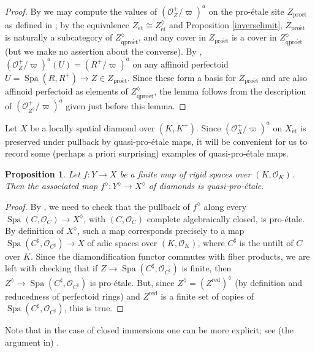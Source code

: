 \documentclass{amsart}
\newtheorem{prop}[subsubsection]{Proposition}
\theoremstyle{remark}
\numberwithin{equation}{subsection}
\newcommand{\cO}{{\mathcal O}}
\DeclareMathOperator{\Spa}{Spa}
\newcommand{\red}{\mathrm{red}}
\newcommand{\et}{\mathrm{\acute{e}t}}
\newcommand{\proet}{\mathrm{pro\acute{e}t}}
\newcommand{\qp}{\mathrm{qpro\acute{e}t}}
\renewcommand{\(}{\left(}
\renewcommand{\)}{\right)}
\begin{document}
\begin{proof}
By \cite[Corollary 3.17]{scholze-padicHodge} we may compute the values of $(\cO_{Z}^{+}/\varpi)^{a}$ on the pro-\'etale site $Z_{\proet}$ as defined in \cite{scholze-padicHodge}; by the equivalence $Z_{\et}\cong Z^{\lozenge}_{\et}$ and Proposition \ref{inverselimit}, $Z_{\proet}$ is naturally a subcategory of $Z^{\lozenge}_{\qp}$, and any cover in $Z_{\proet}$ is a cover in $Z^{\lozenge}_{\qp}$ (but we make no assertion about the converse). By \cite[Lemma 4.10]{scholze-padicHodge}, $(\cO_{Z}^{+}/\varpi)^{a}(U)=(R^{+}/\varpi)^{a}$ on any affinoid perfectoid $U=\Spa(R,R^{+}) \to Z \in Z_{\proet}$. Since these form a basis for $Z_{\proet}$ and are also affinoid perfectoid as elements of $Z^{\lozenge}_{\qp}$, the lemma follows from the description of $(\cO_{Z^{\lozenge}}^{+}/\varpi)^{a}$ given just before this lemma.
\end{proof}

Let $X$ be a locally spatial diamond over $(K,K^{+})$. Since $(\cO^{+}_{X}/\varpi)^{a}$ on $X_{\et}$ is preserved under pullback by quasi-pro-\'etale maps, it will be convenient for us to record some (perhaps a priori surprising) examples of quasi-pro-\'etale maps.

\begin{prop}\label{finite maps}
Let $f \colon Y \to X$ be a finite map of rigid spaces over $(K,\cO_{K})$. Then the associated map $f^{\lozenge} \colon Y^{\lozenge} \to X^{\lozenge}$ of diamonds is quasi-pro-\'etale.
\end{prop}

\begin{proof}
  By \cite[Proposition 13.6]{diamonds}, we need to check that the pullback of $f^\lozenge$ along every $\Spa(C,\cO_{C}) \to X^{\lozenge}$, with $(C,\cO_{C})$ complete algebraically closed, is pro-\'etale. By definition of $X^{\lozenge}$, such a map corresponds precisely to a map $\Spa(C^{\sharp},\cO_{C^{\sharp}}) \to X$ of adic spaces over $(K,\cO_{K})$, where $C^{\sharp}$ is the untilt of $C$ over $K$. Since the diamondification functor commutes with fiber products, we are left with checking that if $Z \to \Spa(C^{\sharp},\cO_{C^{\sharp}})$ is finite, then $Z^{\lozenge} \to \Spa(C^{\sharp},\cO_{C^{\sharp}})$ is pro-\'etale. But, since $Z^{\lozenge}=(Z^\red)^{\lozenge}$ (by definition and reducedness of perfectoid rings) and $Z^\red$ is a finite set of copies of $\Spa(C^{\sharp},\cO_{C^{\sharp}})$, this is true.
\end{proof}

Note that in the case of closed immersions one can be more explicit; see (the argument in) \cite[Remark 7.9]{diamonds}.
\end{document}
